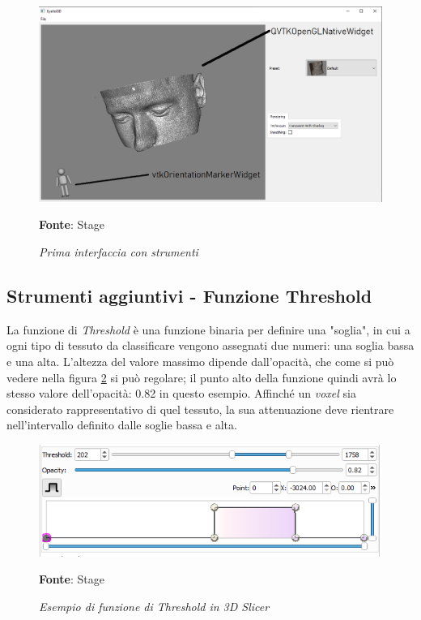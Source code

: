 \begin{figure}[h]
    \centering
    \includegraphics[width=1\textwidth]{immagini/svolgimento/basicwidget.png}
    \caption{\textit{Prima interfaccia con strumenti}}
    \textbf{Fonte}: Stage
    \label{fig: basicwidget}
\end{figure}

\subsection{Strumenti aggiuntivi - Funzione Threshold}
La funzione di \emph{Threshold} è una funzione binaria per definire una "soglia", in cui a ogni tipo di tessuto da classificare vengono assegnati due numeri: una soglia bassa e una alta. L'altezza del valore massimo dipende dall'opacità, che come si può vedere nella figura \ref{fig: Threshold} si può regolare; il punto alto della funzione quindi avrà lo stesso valore dell'opacità: 0.82 in questo esempio. Affinché un \emph{voxel} sia considerato rappresentativo di quel tessuto, la sua attenuazione deve rientrare nell'intervallo definito dalle soglie bassa e alta.

\begin{figure}[h]
    \centering
    \includegraphics[width=1\textwidth]{immagini/svolgimento/slicerthreshold.png}
    \caption{\textit{Esempio di funzione di Threshold in 3D Slicer}}
    \textbf{Fonte}: Stage
    \label{fig: Threshold}
\end{figure}


